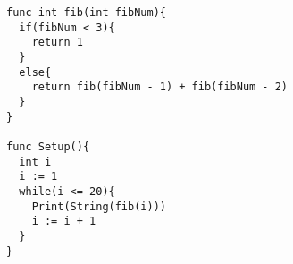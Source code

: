 \begin{lstlisting}[caption={A small recursive program, printing the first 20 numbers of the fibonacci sequence}, label={ex02}]
func int fib(int fibNum){
  if(fibNum < 3){
    return 1
  }
  else{
    return fib(fibNum - 1) + fib(fibNum - 2)
  }
}

func Setup(){
  int i
  i := 1
  while(i <= 20){
    Print(String(fib(i)))
    i := i + 1
  }
}
\end{lstlisting}